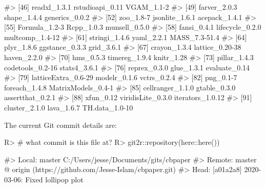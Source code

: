 \documentclass[
]{jss}
\begin{document}
\begin{CodeChunk}
\begin{CodeOutput}
#> [46] readxl_1.3.1        rstudioapi_0.11     VGAM_1.1-2         
#> [49] farver_2.0.3        shape_1.4.4         generics_0.0.2     
#> [52] zoo_1.8-7           jsonlite_1.6.1      acepack_1.4.1      
#> [55] Formula_1.2-3       Rcpp_1.0.3          munsell_0.5.0      
#> [58] fansi_0.4.1         lifecycle_0.2.0     multcomp_1.4-12    
#> [61] stringi_1.4.6       yaml_2.2.1          MASS_7.3-51.4      
#> [64] plyr_1.8.6          ggstance_0.3.3      grid_3.6.1         
#> [67] crayon_1.3.4        lattice_0.20-38     haven_2.2.0        
#> [70] hms_0.5.3           timereg_1.9.4       knitr_1.28         
#> [73] pillar_1.4.3        codetools_0.2-16    stats4_3.6.1       
#> [76] reprex_0.3.0        glue_1.3.1          evaluate_0.14      
#> [79] latticeExtra_0.6-29 modelr_0.1.6        vctrs_0.2.4        
#> [82] png_0.1-7           foreach_1.4.8       MatrixModels_0.4-1 
#> [85] cellranger_1.1.0    gtable_0.3.0        assertthat_0.2.1   
#> [88] xfun_0.12           viridisLite_0.3.0   iterators_1.0.12   
#> [91] cluster_2.1.0       lava_1.6.7          TH.data_1.0-10
\end{CodeOutput}
\end{CodeChunk}

The current Git commit details are:

\begin{CodeChunk}

\begin{CodeInput}
R> # what commit is this file at?
R> git2r::repository(here::here())
\end{CodeInput}

\begin{CodeOutput}
#> Local:    master C:/Users/jesse/Documents/gits/cbpaper
#> Remote:   master @ origin (https://github.com/Jesse-Islam/cbpaper.git)
#> Head:     [a01a2a8] 2020-03-06: Fixed lollipop plot
\end{CodeOutput}
\end{CodeChunk}


\end{document}
